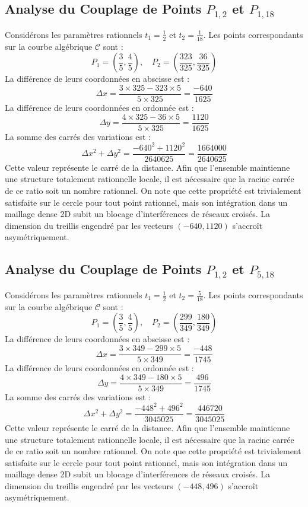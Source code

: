 \documentclass[12pt, a4paper]{article}
\begin{document}
\subsection{Analyse du Couplage de Points $P_{1,2}$ et $P_{1,18}$}
Considérons les paramètres rationnels $t_1 = \frac{1}{2}$ et $t_2 = \frac{1}{18}$.
Les points correspondants sur la courbe algébrique $\mathcal{C}$ sont :
$$ P_1 = \left( \frac{3}{5}, \frac{4}{5} \right), \quad P_2 = \left( \frac{323}{325}, \frac{36}{325} \right) $$
La différence de leurs coordonnées en abscisse est :
$$ \Delta x = \frac{3 \times 325 - 323 \times 5}{5 \times 325} = \frac{-640}{1625} $$
La différence de leurs coordonnées en ordonnée est :
$$ \Delta y = \frac{4 \times 325 - 36 \times 5}{5 \times 325} = \frac{1120}{1625} $$
La somme des carrés des variations est :
$$ \Delta x^2 + \Delta y^2 = \frac{ -640^2 + 1120^2 }{ 2640625 } = \frac{ 1664000 }{ 2640625 } $$
Cette valeur représente le carré de la distance. Afin que l'ensemble maintienne une structure totalement rationnelle locale, il est nécessaire que la racine carrée de ce ratio soit un nombre rationnel. On note que cette propriété est trivialement satisfaite sur le cercle pour tout point rationnel, mais son intégration dans un maillage dense 2D subit un blocage d'interférences de réseaux croisés. La dimension du treillis engendré par les vecteurs $( -640, 1120 )$ s'accroît asymétriquement.


\subsection{Analyse du Couplage de Points $P_{1,2}$ et $P_{5,18}$}
Considérons les paramètres rationnels $t_1 = \frac{1}{2}$ et $t_2 = \frac{5}{18}$.
Les points correspondants sur la courbe algébrique $\mathcal{C}$ sont :
$$ P_1 = \left( \frac{3}{5}, \frac{4}{5} \right), \quad P_2 = \left( \frac{299}{349}, \frac{180}{349} \right) $$
La différence de leurs coordonnées en abscisse est :
$$ \Delta x = \frac{3 \times 349 - 299 \times 5}{5 \times 349} = \frac{-448}{1745} $$
La différence de leurs coordonnées en ordonnée est :
$$ \Delta y = \frac{4 \times 349 - 180 \times 5}{5 \times 349} = \frac{496}{1745} $$
La somme des carrés des variations est :
$$ \Delta x^2 + \Delta y^2 = \frac{ -448^2 + 496^2 }{ 3045025 } = \frac{ 446720 }{ 3045025 } $$
Cette valeur représente le carré de la distance. Afin que l'ensemble maintienne une structure totalement rationnelle locale, il est nécessaire que la racine carrée de ce ratio soit un nombre rationnel. On note que cette propriété est trivialement satisfaite sur le cercle pour tout point rationnel, mais son intégration dans un maillage dense 2D subit un blocage d'interférences de réseaux croisés. La dimension du treillis engendré par les vecteurs $( -448, 496 )$ s'accroît asymétriquement.
\end{document}
